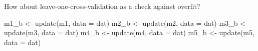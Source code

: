 \documentclass[
  ignorenonframetext,
]{beamer}
\newenvironment{Shaded}{\begin{snugshade}}{\end{snugshade}}
\newcommand{\AttributeTok}[1]{\textcolor[rgb]{0.77,0.63,0.00}{#1}}
\newcommand{\FunctionTok}[1]{\textcolor[rgb]{0.00,0.00,0.00}{#1}}
\newcommand{\NormalTok}[1]{#1}
\newcommand{\OtherTok}[1]{\textcolor[rgb]{0.56,0.35,0.01}{#1}}
\begin{document}
\begin{frame}[fragile]{}
\protect\hypertarget{section-26}{}
How about leave-one-cross-validation as a check against overfit?

\vspace{12pt}
\tiny

\begin{Shaded}
\begin{Highlighting}[]
\NormalTok{m1\_b }\OtherTok{\textless{}{-}} \FunctionTok{update}\NormalTok{(m1, }\AttributeTok{data =}\NormalTok{ dat)}
\NormalTok{m2\_b }\OtherTok{\textless{}{-}} \FunctionTok{update}\NormalTok{(m2, }\AttributeTok{data =}\NormalTok{ dat)}
\NormalTok{m3\_b }\OtherTok{\textless{}{-}} \FunctionTok{update}\NormalTok{(m3, }\AttributeTok{data =}\NormalTok{ dat)}
\NormalTok{m4\_b }\OtherTok{\textless{}{-}} \FunctionTok{update}\NormalTok{(m4, }\AttributeTok{data =}\NormalTok{ dat)}
\NormalTok{m5\_b }\OtherTok{\textless{}{-}} \FunctionTok{update}\NormalTok{(m5, }\AttributeTok{data =}\NormalTok{ dat)}


\end{Highlighting}
\end{Shaded}
\end{frame}
\end{document}
